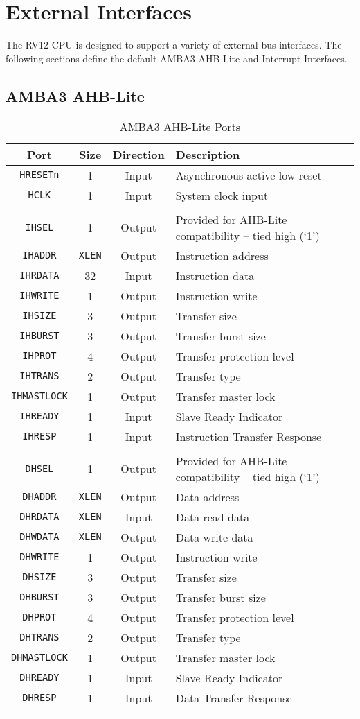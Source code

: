 \chapter{External Interfaces}\label{external-interfaces}

The RV12 CPU is designed to support a variety of external bus interfaces.
The following sections define the default AMBA3 AHB-Lite and Interrupt
Interfaces.

\section{AMBA3 AHB-Lite}\label{amba3-ahb-lite}

\begin{longtable}[]{@{}cccl@{}}
\toprule
Port & Size & Direction & Description\tabularnewline
\midrule
\endhead
\texttt{HRESETn}    & 1 & Input & Asynchronous active low reset\tabularnewline
\texttt{HCLK}       & 1 & Input & System clock input\tabularnewline
\tabularnewline
\texttt{IHSEL}      & 1 & Output & Provided for AHB-Lite compatibility -- tied high (`1')\tabularnewline
\texttt{IHADDR}     & \texttt{XLEN} & Output & Instruction address\tabularnewline
\texttt{IHRDATA}    & 32 & Input & Instruction data\tabularnewline
\texttt{IHWRITE}    & 1 & Output & Instruction write\tabularnewline
\texttt{IHSIZE}     & 3 & Output & Transfer size\tabularnewline
\texttt{IHBURST}    & 3 & Output & Transfer burst size\tabularnewline
\texttt{IHPROT}     & 4 & Output & Transfer protection level\tabularnewline
\texttt{IHTRANS}    & 2 & Output & Transfer type\tabularnewline
\texttt{IHMASTLOCK} & 1 & Output & Transfer master lock\tabularnewline
\texttt{IHREADY}    & 1 & Input & Slave Ready Indicator\tabularnewline
\texttt{IHRESP}     & 1 & Input & Instruction Transfer Response\tabularnewline
\tabularnewline
\texttt{DHSEL}      & 1 & Output & Provided for AHB-Lite compatibility -- tied high (`1')\tabularnewline
\texttt{DHADDR}     & \texttt{XLEN} & Output & Data address\tabularnewline
\texttt{DHRDATA}    & \texttt{XLEN} & Input & Data read data\tabularnewline
\texttt{DHWDATA}    & \texttt{XLEN} & Output & Data write data\tabularnewline
\texttt{DHWRITE}    & 1 & Output & Instruction write\tabularnewline
\texttt{DHSIZE}     & 3 & Output & Transfer size\tabularnewline
\texttt{DHBURST}    & 3 & Output & Transfer burst size\tabularnewline
\texttt{DHPROT}     & 4 & Output & Transfer protection level\tabularnewline
\texttt{DHTRANS}    & 2 & Output & Transfer type\tabularnewline
\texttt{DHMASTLOCK} & 1 & Output & Transfer master lock\tabularnewline
\texttt{DHREADY}    & 1 & Input & Slave Ready Indicator\tabularnewline
\texttt{DHRESP}     & 1 & Input & Data Transfer Response\tabularnewline
\bottomrule
\caption{AMBA3 AHB-Lite Ports}
\label{tab:ahb-ports}
\end{longtable}

